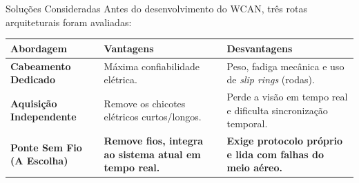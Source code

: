 \begin{frame}{Soluções Consideradas}
    Antes do desenvolvimento do WCAN, três rotas arquiteturais foram avaliadas:
    
    \vspace{0.4cm}
    \begin{table}[]
        \centering
        \footnotesize
        \renewcommand{\arraystretch}{1.5}
        \begin{tabular}{p{} | p{} | p{}}
            \hline
            \textbf{Abordagem} & \textbf{Vantagens} & \textbf{Desvantagens} \\
            \hline
            \textbf{Cabeamento Dedicado} & Máxima confiabilidade elétrica. & Peso, fadiga mecânica e uso de \textit{slip rings} (rodas). \\
            \hline
            \textbf{Aquisição Independente} & Remove os chicotes elétricos curtos/longos. & Perde a visão em tempo real e dificulta sincronização temporal. \\
            \hline
            \textbf{Ponte Sem Fio (A Escolha)} & \textbf{Remove fios, integra ao sistema atual em tempo real.} & \textbf{Exige protocolo próprio e lida com falhas do meio aéreo.} \\
            \hline
        \end{tabular}
    \end{table}
\end{frame}

